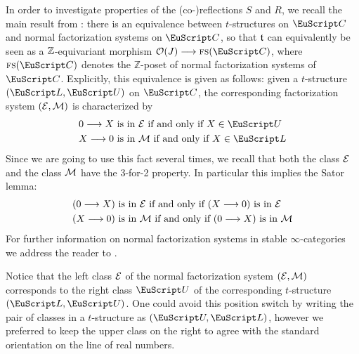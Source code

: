 In order to investigate properties of the (co-)reflections $S$ and $R$, we recall the main result from \cite{FL0}: there is an equivalence between $t$-structures on $\C$ and normal factorization systems on $\C$, so that $\mathfrak{t}$ can equivalently be seen as a $\mathbb{Z}$-equivariant morphism $\O(J)\to  \fs(\C)$, where $\fs(\C)$ denotes the $\mathbb{Z}$-poset of normal factorization systems of $\C$. Explicitly, this equivalence is given as follows: given a $t$-structure $(\cate{L},\cate{U})$ on $\C$,
the corresponding factorization system $(\mathcal{E},\mathcal{M})$ is characterized by
\begin{align*}
0\to X &\text{ is in }\E\text{ if and only if }X\in \cate{U}\\
X\to 0 &\text{ is in }\M\text{ if and only if }X\in \cate{L}
\end{align*}
Since we are going to use this fact several times, we recall that both the class $\mathcal{E}$ and the class $\mathcal{M}$ have the 3-for-2 property. In particular this implies the Sator lemma:
\begin{align*}
(0\longrightarrow X) &\text{ is in }\mathcal{E} \text{ if and only if }(X\longrightarrow 0) \text{ is in }\mathcal{E}\\
(X\longrightarrow 0) &\text{ is in }\mathcal{M} \text{ if and only if }(0\longrightarrow X) \text{ is in }\mathcal{M}
\end{align*}
For further information on normal factorization systems in stable $\infty$-categories we address the reader to \cite{FL0,tstructures}.

\begin{remark}
Notice that the left class $\mathcal{E}$ of the normal factorization system $(\mathcal{E},\mathcal{M})$ corresponds to the right class $\cate{U}$ of the corresponding $t$-structure $(\cate{L},\cate{U})$. One could avoid this position switch by writing the pair of classes in a $t$-structure as $(\cate{U},\cate{L})$, however we preferred to keep the upper class on the right to agree with the standard orientation on the line of real numbers.
\end{remark}


